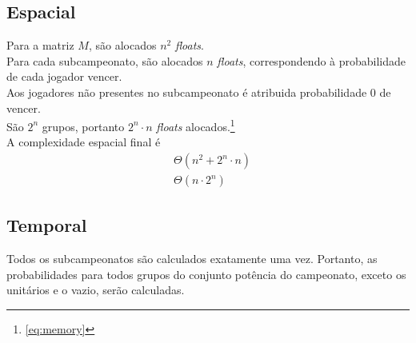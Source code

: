 \documentclass{article}
\begin{document}
\subsection{Espacial}
\noindent Para a matriz $M$, são alocados $n^2$ \textit{floats}.\\[5pt]
Para cada subcampeonato, são alocados $n$ \textit{floats}, correspondendo à probabilidade de cada jogador vencer.\\
Aos jogadores não presentes no subcampeonato é atribuida probabilidade $0$ de vencer. \\[5pt]
São $2^n$ grupos, portanto $2^n \cdot n$ \textit{floats} alocados.\footnote{\autoref{eq:memory}} \\[5pt]
A complexidade espacial final é
\begin{align*}
  & \Theta \left( n^2 + 2^n \cdot n \right) \\
  & \Theta \left(n \cdot 2^n \right)
\end{align*}

\subsection{Temporal}
\noindent Todos os subcampeonatos são calculados exatamente uma vez. Portanto, as probabilidades para todos grupos do conjunto potência do campeonato, exceto os unitários e o vazio, serão calculadas.
\end{document}
